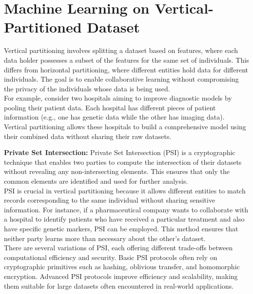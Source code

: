 \chapter{Machine Learning on Vertical-Partitioned Dataset}
Vertical partitioning involves splitting a dataset based on features, where each data holder possesses a subset of the features for the same set of individuals. This differs from horizontal partitioning, where different entities hold data for different individuals. The goal is to enable collaborative learning without compromising the privacy of the individuals whose data is being used.\\
For example, consider two hospitals aiming to improve diagnostic models by pooling their patient data. Each hospital has different pieces of patient information (e.g., one has genetic data while the other has imaging data). Vertical partitioning allows these hospitals to build a comprehensive model using their combined data without sharing their raw datasets.

\textbf{Private Set Intersection:}
Private Set Intersection (PSI) is a cryptographic technique that enables two parties to compute the intersection of their datasets without revealing any non-intersecting elements. This ensures that only the common elements are identified and used for further analysis.\\
PSI is crucial in vertical partitioning because it allows different entities to match records corresponding to the same individual without sharing sensitive information. For instance, if a pharmaceutical company wants to collaborate with a hospital to identify patients who have received a particular treatment and also have specific genetic markers, PSI can be employed. This method ensures that neither party learns more than necessary about the other's dataset.\\
There are several variations of PSI, each offering different trade-offs between computational efficiency and security. Basic PSI protocols often rely on cryptographic primitives such as hashing, oblivious transfer, and homomorphic encryption. Advanced PSI protocols improve efficiency and scalability, making them suitable for large datasets often encountered in real-world applications.

